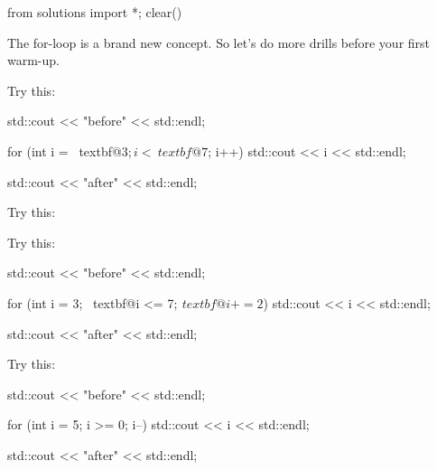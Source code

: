 \begin{python0}
from solutions import *; clear()
\end{python0}

The for-loop is a brand new concept. So let's do more
drills before your first warm-up.


Try this:
\begin{console}[commandchars=\~\@\$]
std::cout << "before" << std::endl;

for (int i = ~textbf@3$; i < ~textbf@7$; i++)
    std::cout << i << std::endl;

std::cout << "after" << std::endl;
\end{console}


Try this:


Try this:
\begin{console}[commandchars=\~\@\$]
std::cout << "before" << std::endl;

for (int i = 3; ~textbf@i <= 7$; ~textbf@i += 2$)
    std::cout << i << std::endl;

std::cout << "after" << std::endl;
\end{console}


Try this:
\begin{console}[commandchars=\~\@\$]
std::cout << "before" << std::endl;

for (int i = 5; i >= 0; i--)
    std::cout << i << std::endl;
    
std::cout << "after" << std::endl;
\end{console}




